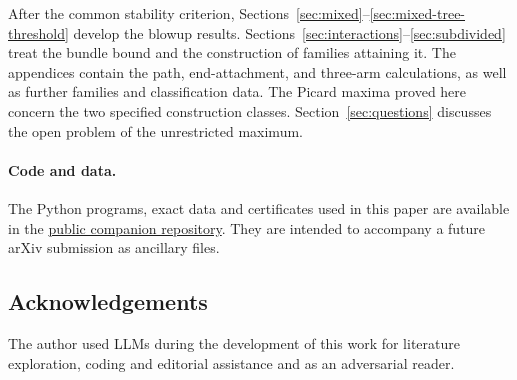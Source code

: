 After the common stability criterion, Sections~\ref{sec:mixed}--\ref{sec:mixed-tree-threshold}
develop the blowup results. Sections~\ref{sec:interactions}--\ref{sec:subdivided}
treat the bundle bound and the construction of families attaining it.
The appendices contain the path, end-attachment, and three-arm
calculations, as well as further families and classification data.
The Picard maxima proved here concern the two specified construction
classes. Section~\ref{sec:questions} discusses the open problem of the
unrestricted maximum.

\paragraph{Code and data.}
The Python programs, exact data and certificates used in this paper are
available in the
\href{https://github.com/bwuebben/toric-tangent-stability/tree/main/paper2}{public companion repository}.
They are intended to accompany a future arXiv submission as ancillary files.

\subsection*{Acknowledgements}
The author used LLMs during the development of this work for literature exploration,
coding and editorial assistance and as an adversarial reader.

